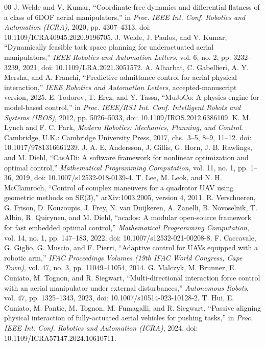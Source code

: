 \documentclass[conference]{IEEEtran}
\begin{document}
\begin{thebibliography}{00}
 J. Welde and V. Kumar, ``Coordinate-free dynamics and differential flatness of a class of 6DOF aerial manipulators,'' in \textit{Proc. IEEE Int. Conf. Robotics and Automation (ICRA)}, 2020, pp. 4307--4313, doi: 10.1109/ICRA40945.2020.9196705.
 J. Welde, J. Paulos, and V. Kumar, ``Dynamically feasible task space planning for underactuated aerial manipulators,'' \textit{IEEE Robotics and Automation Letters}, vol. 6, no. 2, pp. 3232--3239, 2021, doi: 10.1109/LRA.2021.3051572.
 A. Alharbat, C. Gabellieri, A. Y. Mersha, and A. Franchi, ``Predictive admittance control for aerial physical interaction,'' \textit{IEEE Robotics and Automation Letters}, accepted-manuscript version, 2025.
 E. Todorov, T. Erez, and Y. Tassa, ``MuJoCo: A physics engine for model-based control,'' in \textit{Proc. IEEE/RSJ Int. Conf. Intelligent Robots and Systems (IROS)}, 2012, pp. 5026--5033, doi: 10.1109/IROS.2012.6386109.
 K. M. Lynch and F. C. Park, \textit{Modern Robotics: Mechanics, Planning, and Control}. Cambridge, U.K.: Cambridge University Press, 2017, chs.~3--5, 8--9, 11--12. doi: 10.1017/9781316661239.
 J. A. E. Andersson, J. Gillis, G. Horn, J. B. Rawlings, and M. Diehl, ``CasADi: A software framework for nonlinear optimization and optimal control,'' \textit{Mathematical Programming Computation}, vol. 11, no. 1, pp. 1--36, 2019, doi: 10.1007/s12532-018-0139-4.
 T. Lee, M. Leok, and N. H. McClamroch, ``Control of complex maneuvers for a quadrotor UAV using geometric methods on SE(3),'' arXiv:1003.2005, version 4, 2011.
 R. Verschueren, G. Frison, D. Kouzoupis, J. Frey, N. van Duijkeren, A. Zanelli, B. Novoselnik, T. Albin, R. Quirynen, and M. Diehl, ``acados: A modular open-source framework for fast embedded optimal control,'' \textit{Mathematical Programming Computation}, vol. 14, no. 1, pp. 147--183, 2022, doi: 10.1007/s12532-021-00208-8.
 F. Caccavale, G. Giglio, G. Muscio, and F. Pierri, ``Adaptive control for UAVs equipped with a robotic arm,'' \textit{IFAC Proceedings Volumes (19th IFAC World Congress, Cape Town)}, vol. 47, no. 3, pp. 11049--11054, 2014.
 G. Malczyk, M. Brunner, E. Cuniato, M. Tognon, and R. Siegwart, ``Multi-directional interaction force control with an aerial manipulator under external disturbances,'' \textit{Autonomous Robots}, vol. 47, pp. 1325--1343, 2023, doi: 10.1007/s10514-023-10128-2.
 T. Hui, E. Cuniato, M. Pantic, M. Tognon, M. Fumagalli, and R. Siegwart, ``Passive aligning physical interaction of fully-actuated aerial vehicles for pushing tasks,'' in \textit{Proc. IEEE Int. Conf. Robotics and Automation (ICRA)}, 2024, doi: 10.1109/ICRA57147.2024.10610711.
\end{thebibliography}
\end{document}
